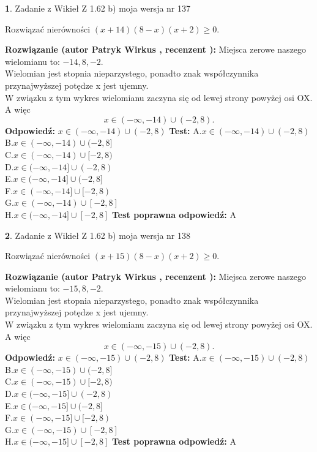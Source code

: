 \documentclass[12pt, a4paper]{article}
\theoremstyle{definition} %
\newtheorem{zad}{}
\newcommand{\zadStart}[1]{\begin{zad}#1\newline}
\newcommand{\zadStop}{\end{zad}}
\newcommand{\rozwStart}[2]{\noindent \textbf{Rozwiązanie (autor #1 , recenzent #2): }\newline}
\newcommand{\rozwStop}{\newline}
\newcommand{\odpStart}{\noindent \textbf{Odpowiedź:}\newline}
\newcommand{\odpStop}{\newline}
\newcommand{\testStart}{\noindent \textbf{Test:}\newline}
\newcommand{\testStop}{\newline}
\newcommand{\kluczStart}{\noindent \textbf{Test poprawna odpowiedź:}\newline}
\newcommand{\kluczStop}{\newline}
\begin{document}
\zadStart{Zadanie z Wikieł Z 1.62 b) moja wersja nr 137}

Rozwiązać nierówności $(x+14)(8-x)(x+2)\ge0$.
\zadStop
\rozwStart{Patryk Wirkus}{}
Miejsca zerowe naszego wielomianu to: $-14, 8, -2$.\\
Wielomian jest stopnia nieparzystego, ponadto znak współczynnika przy\linebreak najwyższej potędze x jest ujemny.\\ W związku z tym wykres wielomianu zaczyna się od lewej strony powyżej osi OX. A więc $$x \in (-\infty,-14) \cup (-2,8).$$
\rozwStop
\odpStart
$x \in (-\infty,-14) \cup (-2,8)$
\odpStop
\testStart
A.$x \in (-\infty,-14) \cup (-2,8)$\\
B.$x \in (-\infty,-14) \cup (-2,8]$\\
C.$x \in (-\infty,-14) \cup [-2,8)$\\
D.$x \in (-\infty,-14] \cup (-2,8)$\\
E.$x \in (-\infty,-14] \cup (-2,8]$\\
F.$x \in (-\infty,-14] \cup [-2,8)$\\
G.$x \in (-\infty,-14) \cup [-2,8]$\\
H.$x \in (-\infty,-14] \cup [-2,8]$
\testStop
\kluczStart
A
\kluczStop



\zadStart{Zadanie z Wikieł Z 1.62 b) moja wersja nr 138}

Rozwiązać nierówności $(x+15)(8-x)(x+2)\ge0$.
\zadStop
\rozwStart{Patryk Wirkus}{}
Miejsca zerowe naszego wielomianu to: $-15, 8, -2$.\\
Wielomian jest stopnia nieparzystego, ponadto znak współczynnika przy\linebreak najwyższej potędze x jest ujemny.\\ W związku z tym wykres wielomianu zaczyna się od lewej strony powyżej osi OX. A więc $$x \in (-\infty,-15) \cup (-2,8).$$
\rozwStop
\odpStart
$x \in (-\infty,-15) \cup (-2,8)$
\odpStop
\testStart
A.$x \in (-\infty,-15) \cup (-2,8)$\\
B.$x \in (-\infty,-15) \cup (-2,8]$\\
C.$x \in (-\infty,-15) \cup [-2,8)$\\
D.$x \in (-\infty,-15] \cup (-2,8)$\\
E.$x \in (-\infty,-15] \cup (-2,8]$\\
F.$x \in (-\infty,-15] \cup [-2,8)$\\
G.$x \in (-\infty,-15) \cup [-2,8]$\\
H.$x \in (-\infty,-15] \cup [-2,8]$
\testStop
\kluczStart
A
\kluczStop
\end{document}
